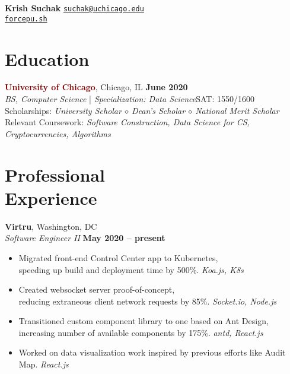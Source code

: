\documentclass[margin]{resume}
\begin{document}
\hspace{-28mm}\textbf {\Large Krish Suchak}
\hfill \textcolor{blu}{\texttt{\href{mailto:suchak@uchicago.edu}{suchak@uchicago.edu}}}
\\ \phantom{invisible} \hfill \hspace{5mm} \texttt{\href{https://forcepu.sh}{force}}\textcolor{blu}{\texttt{\href{https://forcepu.sh}{pu.sh}}}
\vspace{4mm}

    \section{\mysidestyle Education}

    \textcolor{maroon}{\textbf{University of Chicago}}, Chicago, IL \hfill \textbf{June 2020} \vspace{2mm}\\\vspace{1mm}%
    \textsl{BS, Computer Science} | \textsl{Specialization: Data Science}\hfill SAT: 1550/1600\\
Scholarships: \textit{University Scholar $\smwhtdiamond$ Dean’s Scholar $\smwhtdiamond$ National Merit Scholar}\\
Relevant Coursework: \textit{Software Construction, Data Science for CS, Cryptocurrencies, Algorithms}

    \section{\mysidestyle Professional\\Experience}

    
    \textcolor{blu}{\textbf{Virtru}}, Washington, DC \vspace{2mm}\\\vspace{1mm}%
   \textsl{Software Engineer II} \hfill \textbf{May 2020 -- present}

\begin{itemize}
\item Migrated front-end Control Center app to Kubernetes, \\speeding up build and deployment time by 500\%. \phantom{invisible} \hfill \textit{Koa.js, K8s}
\item Created websocket server proof-of-concept, \\reducing extraneous client network requests by 85\%. \hfill \textit{Socket.io, Node.js}
\item Transitioned custom component library to one based on Ant Design, \\increasing number of available components by 175\%. \hfill \textit{antd, React.js}
\item Worked on data visualization work inspired by previous efforts like Audit Map. \hfill \textit{React.js}
\end{itemize}    
\end{document}
